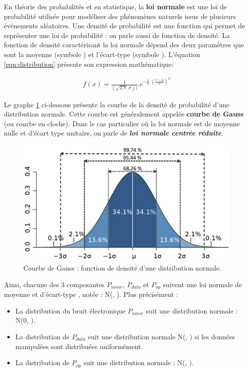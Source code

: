 \documentclass[10pt, oneside, a4paper]{article}
\begin{document}
En théorie des probabilités et en statistique, la \textbf{loi normale} est une loi de probabilité utilisée pour modéliser des phénomènes naturels issus de plusieurs événements aléatoires. Une densité de probabilité est une fonction qui permet de représenter une loi de probabilité : on parle aussi de fonction de densité. La fonction de densité caractérisant la loi normale dépend des deux paramètres que sont la moyenne (symbole \mu) et l'écart-type (symbole \sigma). L'équation \ref{eqn:distribution} présente son expression mathématique:

\begin{gather}
    f(x)=\frac{1}{(\sqrt{2.\pi }.\sigma))} .e^{-\frac{1}{2}.(\frac{x-\mu}{\sigma})^2}\label{eqn:distribution}
\end{gather}


Le graphe \ref{fig:distribution} ci-dessous présente la courbe de la densité de probabilité d'une distribution normale. Cette courbe est généralement appelée \textbf{courbe de Gauss} (ou courbe en cloche). Dans le cas particulier où la loi normale est de moyenne nulle et d'écart type unitaire, on parle de \textbf{\textit{loi normale centrée réduite}}.

\begin{figure}[htbp]
    \centering
    \includegraphics[scale=1.1]{image/distribution}    
    \caption{Courbe de Gauss : fonction de densité d'une distribution normale.}    
    \label{fig:distribution}
\end{figure}

Ainsi, chacune des 3 composantes $P_{noise}$, $P_{data}$ et $P_{op}$ suivent une loi normale de moyenne {\mu} et d'écart-type \sigma, notée : N(\mu, \sigma). Plus précisément : 
\begin{itemize}
\item La distribution du bruit électronique $P_{noise}$ suit une distribution normale : N(0, \sigma).
\item La distribution de $P_{data}$ suit une distribution normale N(\mu, \sigma) si les données manipulées sont distribuées uniformément.
\item La distribution de $P_{op}$  suit une distribution normale : N(\mu, \sigma).
\end{itemize}
\end{document}
